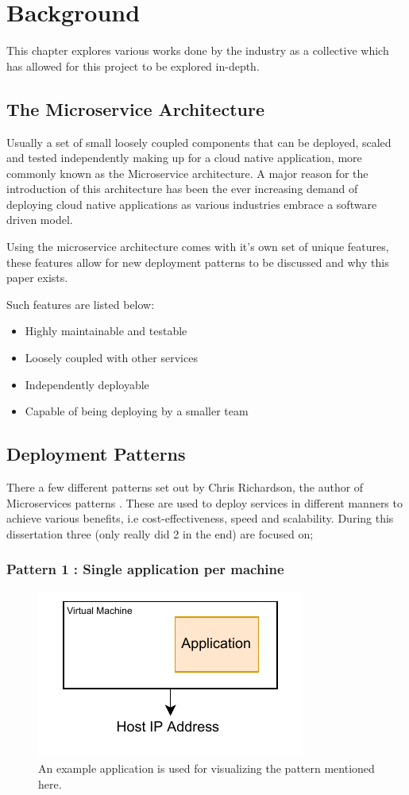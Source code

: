 \chapter{Background}
This chapter explores various works done by the industry as a collective which has allowed for this project to be explored in-depth. 

\section{The Microservice Architecture}
Usually a set of small loosely coupled components that can be deployed, scaled and tested independently making up for a cloud native application, more commonly known as the Microservice architecture.  A major reason for the introduction of this architecture has been the ever increasing demand of deploying cloud native applications as various industries embrace a software driven model. 

Using the microservice architecture comes with it’s own set of unique features, these features allow for new deployment patterns to be discussed and why this paper exists. 

Such features are listed below: 

\begin{itemize}
    \item Highly maintainable and testable 
    \item Loosely coupled with other services 
    \item Independently deployable 
    \item Capable of being deploying by a smaller team
\end{itemize}

\section{Deployment Patterns}
There a few different patterns set out by Chris Richardson, the author of Microservices patterns \cite{Chr19}. These are used to deploy services in different manners to achieve various benefits, i.e cost-effectiveness, speed and scalability. During this dissertation three (only really did 2 in the end) are focused on; 

\subsection{Pattern 1 : Single application per machine}
    \begin{figure}[H]
        \centering
        \includegraphics[width=0.5\linewidth]{images/P1_SAPM.pdf}
        \caption{An example application is used for visualizing the pattern mentioned here.}
    \end{figure}  

